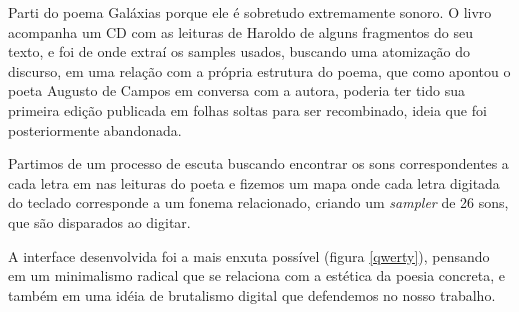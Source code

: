 Parti do poema Galáxias porque ele é sobretudo extremamente sonoro. O livro acompanha um CD com as leituras de Haroldo de alguns fragmentos do seu texto, e foi de onde extraí os samples usados, buscando uma atomização do discurso, em uma relação com a própria estrutura do poema, que como apontou o poeta Augusto de Campos em conversa com a autora, poderia ter tido sua primeira edição publicada em folhas soltas para ser recombinado, ideia que foi posteriormente abandonada.

Partimos de um processo de escuta buscando encontrar os sons correspondentes a cada letra em nas leituras do poeta e fizemos um mapa onde cada letra digitada do teclado corresponde a um fonema relacionado, criando um \emph{sampler} de 26 sons, que são disparados ao digitar.

A interface desenvolvida foi a mais enxuta possível (figura \ref{qwerty}), pensando em um minimalismo radical que se relaciona com a estética da poesia concreta, e também em uma idéia de brutalismo digital que defendemos no nosso trabalho.

